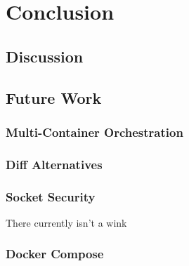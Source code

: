 \chapter{Conclusion}
\section{Discussion}
\section{Future Work}
\label{sec:future}
\subsection{Multi-Container Orchestration}
\subsection{Diff Alternatives}
\subsection{Socket Security}
There currently isn't a wink
\subsection{Docker Compose}
